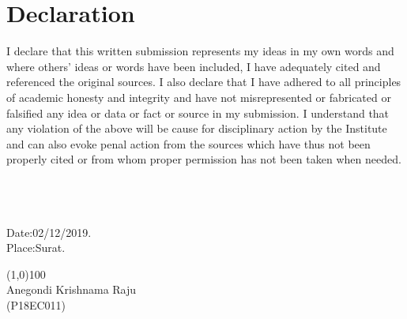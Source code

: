 

\chapter*{Declaration}

I declare that this written submission represents my ideas in my own words and where others' ideas or words have been included, I have adequately cited and referenced the original sources. I also declare that I have adhered to all principles of academic honesty and integrity and have not misrepresented or fabricated or falsified any idea or data or fact or source in my submission. I understand that any violation of the above will be cause for disciplinary action by the Institute and can also evoke penal action from the sources which have thus not been properly cited or from whom proper permission has not been taken when needed.\\
\\
\\
\\
\begin{minipage}[t]{7cm}
	\begin{flushleft}
			\vspace*{7mm}
		Date:02/12/2019.\\
		Place:Surat.\\
	\end{flushleft}
\end{minipage}
\hfill
\begin{minipage}[t]{7cm}
	\begin{flushright}
		\line(1,0){100}\\
		Anegondi Krishnama Raju\\[0.01in]
		(P18EC011)\\
	\end{flushright}
\end{minipage}
